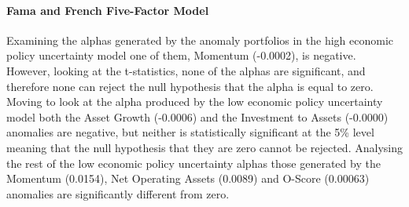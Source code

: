 \documentclass[12pt, a4paper, oneside]{article}
\begin{document}
\paragraph{Fama and French Five-Factor Model}
Examining the alphas generated by the anomaly portfolios in the high economic policy uncertainty model one of them, Momentum (-0.0002), is negative. However, looking at the t-statistics, none of the alphas are significant, and therefore none can reject the null hypothesis that the alpha is equal to zero. Moving to look at the alpha produced by the low economic policy uncertainty model both the Asset Growth (-0.0006) and the Investment to Assets (-0.0000) anomalies are negative, but neither is statistically significant at the 5\% level meaning that the null hypothesis that they are zero cannot be rejected. Analysing the rest of the low economic policy uncertainty alphas those generated by the Momentum (0.0154), Net Operating Assets (0.0089) and O-Score (0.00063) anomalies are significantly different from zero. 
\end{document}
